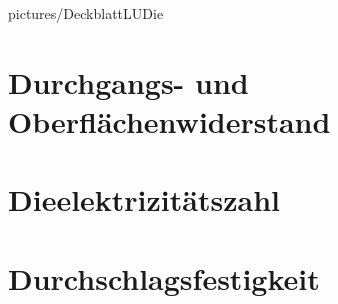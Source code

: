 \documentclass[a4paper,twoside,12pt,DIV=13,BCOR=5mm,numbers=noenddot,cleardoublepage=empty]{scrbook}
\begin{document}
    \renewcommand{\baselinestretch}{1.25}
    \newcommand{\StudentA}{Philipp Hanser}
    \newcommand{\MatrNrA}{11775264}
    \newcommand{\StudentB}{Florian Strebl}
    \newcommand{\MatrNrB}{11712190}
    \newcommand{\StudentC}{Alexander Seiler}
    \newcommand{\MatrNrC}{11771276}

    \newcommand{\LUDatum}{06.06.2019}
    \newcommand{\LUGruppe}{Gr. 15}
    \newcommand{\LUBetreuer}{Geiginger, Lisa-Marie}  

    \large
    
    {pictures/DeckblattLUDie}


    \setcounter{tocdepth}{3}

    \setcounter{page}{0}
    \renewcommand{\thepage}{\roman{page}}
    \tableofcontents \cleardoublepage

    \setcounter{page}{1}
    \renewcommand{\thepage}{\arabic{page}}
    \setcounter{chapter}{0}

    \chapter{Durchgangs- und Oberfl\"achenwiderstand}

    \chapter{Dieelektrizit\"atszahl}

    \chapter{Durchschlagsfestigkeit}
\end{document}
